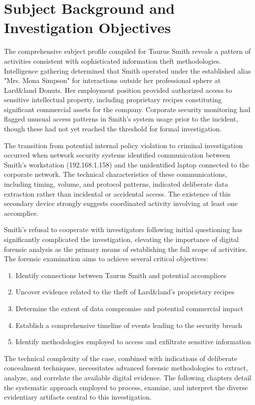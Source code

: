 \section{Subject Background and Investigation Objectives}
The comprehensive subject profile compiled for Taurus Smith reveals a pattern of activities consistent with sophisticated information theft methodologies. Intelligence gathering determined that Smith operated under the established alias "Mrs. Mona Simpson" for interactions outside her professional sphere at Lard\&land Donuts. Her employment position provided authorized access to sensitive intellectual property, including proprietary recipes constituting significant commercial assets for the company. Corporate security monitoring had flagged unusual access patterns in Smith's system usage prior to the incident, though these had not yet reached the threshold for formal investigation.

The transition from potential internal policy violation to criminal investigation occurred when network security systems identified communication between Smith's workstation (192.168.1.158) and the unidentified laptop connected to the corporate network. The technical characteristics of these communications, including timing, volume, and protocol patterns, indicated deliberate data extraction rather than incidental or accidental access. The existence of this secondary device strongly suggests coordinated activity involving at least one accomplice.

Smith's refusal to cooperate with investigators following initial questioning has significantly complicated the investigation, elevating the importance of digital forensic analysis as the primary means of establishing the full scope of activities. The forensic examination aims to achieve several critical objectives:

\begin{enumerate}
    \item Identify connections between Taurus Smith and potential accomplices
    \item Uncover evidence related to the theft of Lard\&land's proprietary recipes
    \item Determine the extent of data compromise and potential commercial impact
    \item Establish a comprehensive timeline of events leading to the security breach
    \item Identify methodologies employed to access and exfiltrate sensitive information
\end{enumerate}

The technical complexity of the case, combined with indications of deliberate concealment techniques, necessitates advanced forensic methodologies to extract, analyze, and correlate the available digital evidence. The following chapters detail the systematic approach employed to process, examine, and interpret the diverse evidentiary artifacts central to this investigation.